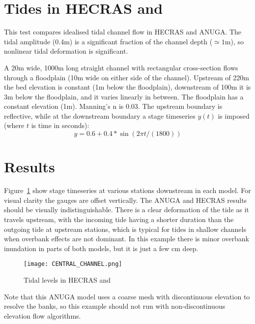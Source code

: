 \section{Tides in HECRAS and \anuga{}}
This test compares idealised tidal channel flow in HECRAS and ANUGA. The tidal
amplitude (0.4m) is a significant fraction of the channel depth ($\simeq 1$m),
so nonlinear tidal deformation is significant.  

A 20m wide, 1000m long straight channel with rectangular cross-section flows through a
floodplain (10m wide on either side of the channel). Upstream of 220m the bed
elevation is constant (1m below the floodplain), downstream of 100m it is 3m below
the floodplain, and it varies linearly in between. The floodplain has a constant
elevation (1m). Manning's n is 0.03. The upstream boundary is reflective, while
at the downstream boundary a stage timeseries $y(t)$ is imposed (where $t$ is
time in seconds):
$$y=0.6+0.4*\sin(2\pi t/(1800))$$

\section{Results}
Figure~\ref{result} show stage timeseries at various stations downstream in each model.
For visual clarity the gauges are offset vertically.  The ANUGA and HECRAS
results should be visually indistinguishable.  There is a clear deformation of
the tide as it travels upstream, with the incoming tide having a shorter
duration than the outgoing tide at upstream stations, which is typical for
tides in shallow channels when overbank effects are not dominant. In this
example there is minor overbank inundation in parts of both models, but it is
just a few cm deep.

\begin{figure}
\begin{center}
\texttt{[image: CENTRAL\_CHANNEL.png]}
\end{center}
\caption{Tidal levels in HECRAS and \anuga{}}
\label{result}
\end{figure}

Note that this ANUGA model uses a coarse mesh with discontinuous elevation to
resolve the banks, so this example should not run with non-discontinuous
elevation flow algorithms.

